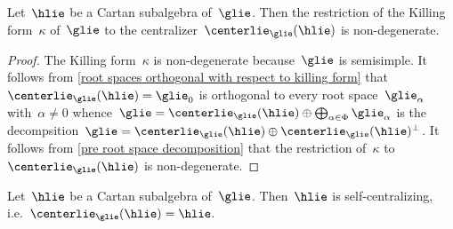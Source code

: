\begin{corollary}
  \label{restriction of killing form to centralizer is non-degenerate}
  Let~$\hlie$ be a Cartan subalgebra of~$\glie$.
  Then the restriction of the Killing form~$\kappa$ of~$\glie$ to the centralizer~$\centerlie_{\glie}(\hlie)$ is non-degenerate.
\end{corollary}


\begin{proof}
  The Killing form~$\kappa$ is non-degenerate because~$\glie$ is semisimple.
  It follows from \cref{root spaces orthogonal with respect to killing form} that~$\centerlie_{\glie}(\hlie) = \glie_0$ is orthogonal to every root space~$\glie_\alpha$ with~$\alpha \neq 0$ whence~$\glie = \centerlie_{\glie}(\hlie) \oplus \bigoplus_{\alpha \in \Phi} \glie_\alpha$ is the decompsition~$\glie = \centerlie_{\glie}(\hlie) \oplus \centerlie_{\glie}(\hlie)^\perp$.
  It follows from \cref{pre root space decomposition} that the restriction of~$\kappa$ to~$\centerlie_{\glie}(\hlie)$ is non-degenerate.
\end{proof}


\begin{proposition}
  \label{csa are self-centralizing}
  Let~$\hlie$ be a Cartan subalgebra of~$\glie$.
  Then~$\hlie$ is self-centralizing, i.e.~$\centerlie_{\glie}(\hlie) = \hlie$.
\end{proposition}


